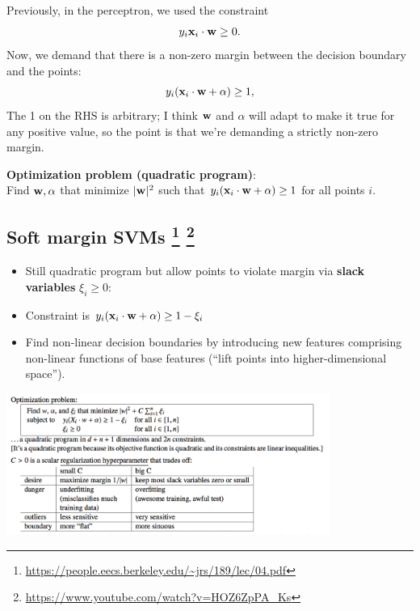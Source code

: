 \documentclass[12pt]{article}
\begin{document}
Previously, in the perceptron, we used the constraint
$$y_i \mathbf x_i \cdot \mathbf w \geq 0.$$
Now, we demand that there is a non-zero margin between the decision boundary
and the points:
$$y_i (\mathbf x_i \cdot \mathbf w + \alpha) \geq 1,$$
The 1 on the RHS is arbitrary; I think $\mathbf w$ and $\alpha$ will adapt to make it
true for any positive value, so the point is that we're demanding a strictly
non-zero margin.
\\
\begin{mdframed}
  \textbf{Optimization problem (quadratic program)}:\\
    Find $\mathbf w, \alpha$ that minimize $|\mathbf w|^2$ such that
    $y_i(\mathbf x_i \cdot \mathbf w + \alpha) \geq 1$ for all points $i$.
\end{mdframed}

\subsection*{Soft margin SVMs
\footnote{\url{https://people.eecs.berkeley.edu/~jrs/189/lec/04.pdf}}
\footnote{ \url{https://www.youtube.com/watch?v=HOZ6ZpPA_Ks}}
}

\begin{itemize}
\item Still quadratic program but allow points to violate margin via
  \textbf{slack variables} $\xi_i \geq 0$:
\item Constraint is $y_i(\mathbf x_i \cdot \mathbf w + \alpha) \geq 1 - \xi_i$
\item Find non-linear decision boundaries by introducing new features
  comprising non-linear functions of base features (``lift points into
  higher-dimensional space'').
\end{itemize}

\includegraphics[width=300pt]{img/machine-learning-svm-1.png}



\end{document}
